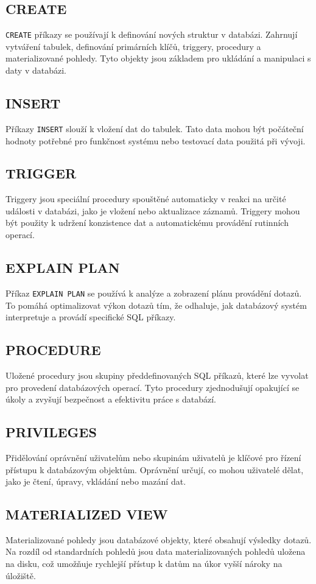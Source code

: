 \documentclass[11pt,a4paper]{article}
\begin{document}
\subsection{CREATE}
\texttt{CREATE} příkazy se používají k definování nových struktur v databázi. Zahrnují vytváření tabulek, definování primárních klíčů, triggery, procedury a materializované pohledy. Tyto objekty jsou základem pro ukládání a manipulaci s daty v databázi.

\subsection{INSERT}
Příkazy \texttt{INSERT} slouží k vložení dat do tabulek. Tato data mohou být počáteční hodnoty potřebné pro funkčnost systému nebo testovací data použitá při vývoji.

\subsection{TRIGGER}
Triggery jsou speciální procedury spouštěné automaticky v reakci na určité události v databázi, jako je vložení nebo aktualizace záznamů. Triggery mohou být použity k udržení konzistence dat a automatickému provádění rutinních operací.

\subsection{EXPLAIN PLAN}
Příkaz \texttt{EXPLAIN PLAN} se používá k analýze a zobrazení plánu provádění dotazů. To pomáhá optimalizovat výkon dotazů tím, že odhaluje, jak databázový systém interpretuje a provádí specifické SQL příkazy.

\subsection{PROCEDURE}
Uložené procedury jsou skupiny předdefinovaných SQL příkazů, které lze vyvolat pro provedení databázových operací. Tyto procedury zjednodušují opakující se úkoly a zvyšují bezpečnost a efektivitu práce s databází.

\subsection{PRIVILEGES}
Přidělování oprávnění uživatelům nebo skupinám uživatelů je klíčové pro řízení přístupu k databázovým objektům. Oprávnění určují, co mohou uživatelé dělat, jako je čtení, úpravy, vkládání nebo mazání dat.

\subsection{MATERIALIZED VIEW}
Materializované pohledy jsou databázové objekty, které obsahují výsledky dotazů. Na rozdíl od standardních pohledů jsou data materializovaných pohledů uložena na disku, což umožňuje rychlejší přístup k datům na úkor vyšší nároky na úložiště.
\end{document}
